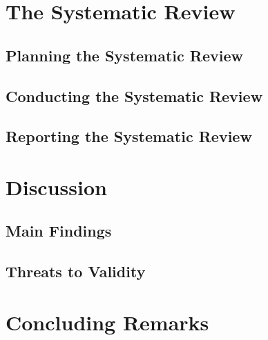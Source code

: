 \documentclass{llncs}
\begin{document}
\section{The Systematic Review}\label{method}


	\subsection{Planning the Systematic Review}\label{planning}
	
	\subsection{Conducting the Systematic Review}\label{conducting}
	
	\subsection{Reporting the Systematic Review}\label{reporting}
	

\section{Discussion}\label{sec:discussion_and_threats}
	

\subsection{Main Findings}\label{sec:principle_findings}
	

\subsection{Threats to Validity}\label{threats}
		


\section{Concluding Remarks}\label{conclusion}
		





\end{document}
